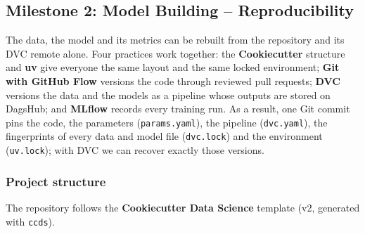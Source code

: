 \documentclass[11pt]{article}
\begin{document}
\subsection{Milestone 2: Model Building -- Reproducibility}
The data, the model and its metrics can be rebuilt from the repository and its DVC remote alone. Four practices work together: the \textbf{Cookiecutter} structure and \textbf{uv} give everyone the same layout and the same locked environment; \textbf{Git with GitHub Flow} versions the code through reviewed pull requests; \textbf{DVC} versions the data and the models as a pipeline whose outputs are stored on DagsHub; and \textbf{MLflow} records every training run. As a result, one Git commit pins the code, the parameters (\texttt{params.yaml}), the pipeline (\texttt{dvc.yaml}), the fingerprints of every data and model file (\texttt{dvc.lock}) and the environment (\texttt{uv.lock}); with DVC we can recover exactly those versions.

\newpage

\subsubsection{Project structure}

The repository follows the \textbf{Cookiecutter Data Science} template (v2, generated with \texttt{ccds}).
\end{document}
